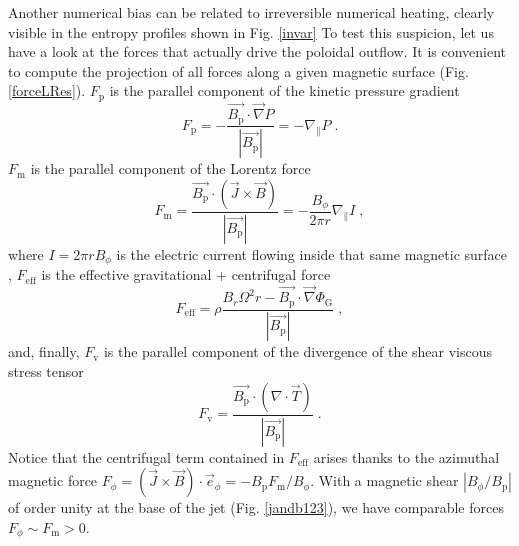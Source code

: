 \documentclass{aa}
\begin{document}
Another numerical bias can be related to irreversible numerical heating, clearly visible in the entropy profiles shown in Fig. \ref{invar} To test this suspicion, let us have a look at the forces that
actually drive the poloidal outflow. It is convenient to compute the projection of all forces along a given magnetic surface (Fig. \ref{forceLRes}).
%
$F_\mathrm{p}$ is the parallel component of the kinetic pressure gradient
\begin{equation}
F_\mathrm{p} = - \frac{ \vec{B_\mathrm{p}} \cdot \vec \nabla P }{\left| \vec{B_\mathrm{p}} \right|} = - \nabla_\parallel P \; .
\end{equation}
$F_\mathrm{m}$ is the parallel component of the Lorentz force
\begin{equation}
F_\mathrm{m} = \frac{\vec{B_\mathrm{p}} \cdot \left( \vec{J} \times \vec{B} \right) }{\left| \vec{ B_\mathrm{p}} \right|} = - \frac{B_\phi}{2\pi r} \nabla_\parallel I \; ,
\end{equation}
where $I= 2\pi r B_\phi$ is the electric current flowing inside that same magnetic surface \citep{1997A&A...319..340F}, $F_\mathrm{eff}$ is the effective gravitational + centrifugal force
\begin{equation}
F_\mathrm{eff} = \rho \frac{ B_r \Omega^2 r - \vec{B_\mathrm{p}} \cdot \vec \nabla \Phi_\mathrm{G} }{\left| \vec{B_\mathrm{p}} \right|} \; ,
\end{equation}
and, finally, $F_\mathrm{v}$ is the parallel component of the divergence of the shear viscous stress tensor
\begin{equation}
F_\mathrm{v} = \frac{ \vec{B_\mathrm{p}} \cdot \left( \nabla \cdot \vec{T} \right) }{\left| \vec{B_\mathrm{p}} \right|} \; .
\end{equation}
%
Notice that the centrifugal term contained in $F_\mathrm{eff}$ arises thanks to the azimuthal magnetic force $F_\phi = \left( \vec{J} \times \vec{B} \right) \cdot \vec e_{\phi} = - B_\mathrm{p}
F_\mathrm{m}/B_\phi$. With a magnetic shear $| B_\phi/B_\mathrm{p} |$ of order unity at the base of the jet (Fig. \ref{jandb123}), we have comparable forces $F_\phi \sim F_\mathrm{m} >0$.
\end{document}
